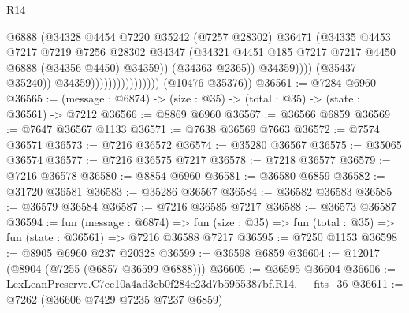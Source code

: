 \begin{lexlean}{R14}
\begin{coremodule}
                                                @6888
                                                (@34328
                                                  @4454
                                                  @7220
                                                  @35242
                                                  (@7257 @28302)
                                                  @36471
                                                  (@34335
                                                    @4453
                                                    @7217
                                                    @7219
                                                    @7256
                                                    @28302
                                                    @34347
                                                    (@34321
                                                      @4451
                                                      @185
                                                      @7217
                                                      @7217
                                                      @4450
                                                      @6888
                                                      (@34356 @4450)
                                                      @34359))
                                                  (@34363 @2365))
                                                @34359))))
                                        (@35437 @35240))
                                      @34359))))))))))))))))
      (@10476 @35376))
@36561 := @7284 @6960
@36565 := (message : @6874) -> (size : @35) -> (total : @35) -> (state : @36561) -> @7212
@36566 := @8869 @6960
@36567 := @36566 @6859
@36569 := @7647 @36567 @1133
@36571 := @7638 @36569 @7663
@36572 := @7574 @36571
@36573 := @7216 @36572
@36574 := @35280 @36567
@36575 := @35065 @36574
@36577 := @7216 @36575 @7217
@36578 := @7218 @36577
@36579 := @7216 @36578
@36580 := @8854 @6960
@36581 := @36580 @6859
@36582 := @31720 @36581
@36583 := @35286 @36567
@36584 := @36582 @36583
@36585 := @36579 @36584
@36587 := @7216 @36585 @7217
@36588 := @36573 @36587
@36594 := fun (message : @6874) =>
  fun (size : @35) => fun (total : @35) => fun (state : @36561) => @7216 @36588 @7217
@36595 := @7250 @1153
@36598 := @8905 @6960 @237 @20328
@36599 := @36598 @6859
@36604 := @12017 (@8904 (@7255 (@6857 @36599 @6888)))
@36605 := @36595 @36604
@36606 := LexLeanPreserve.C7ec10a4ad3cb0f284e23d7b5955387bf.R14.__fits_36
@36611 := @7262 (@36606 @7429 @7235 @7237 @6859)

\end{coremodule}
\end{lexlean}
